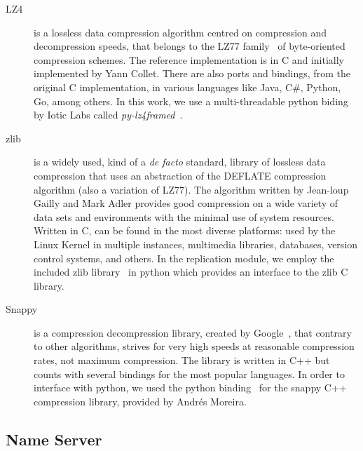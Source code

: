 \begin{description}
	\item [LZ4] is a lossless data compression algorithm centred on compression and decompression speeds, that belongs to the LZ77 family~\cite{lz77} of byte-oriented compression schemes. The reference implementation is in C and initially implemented by Yann Collet. There are also ports and bindings, from the original C implementation, in various languages like Java, C\#, Python, Go, among others. In this work, we use a multi-threadable python biding by Iotic Labs called \textit{py-lz4framed}~\cite{lz4framed}.
	\item [zlib] is a widely used, kind of a \textit{de facto} standard, library of lossless data compression that uses an abstraction of the DEFLATE compression algorithm (also a variation of LZ77). The algorithm written by Jean-loup Gailly and Mark Adler provides good compression on a wide variety of data sets and environments with the minimal use of system resources.~\cite{zlib} Written in C, can be found in the most diverse platforms: used by the Linux Kernel in multiple instances, multimedia libraries, databases, version control systems, and others. In the replication module, we employ the included zlib library~\cite{py_zlib} in python which provides an interface to the zlib C library.
	\item [Snappy] is a compression \/ decompression library, created by Google~\cite{snappy}, that contrary to other algorithms, strives for very high speeds at reasonable compression rates, not maximum compression. The library is written in C++ but counts with several bindings for the most popular languages. In order to interface with python, we used the python binding~\cite{py_snappy} for the snappy C++ compression library, provided by Andrés Moreira.
\end{description}

\subsection{Name Server}
\label{sub:impl_icbdrep_name_server}


